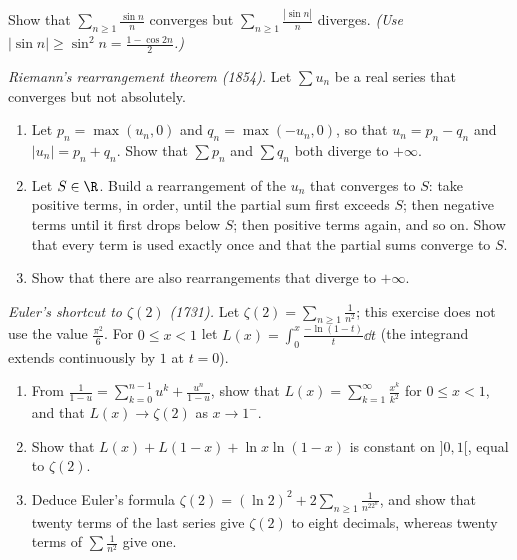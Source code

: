 \begin{exercise}[$\star\star$]\label{ex:sinn}
Show that $\sum_{n\ge1}\frac{\sin n}n$ converges but $\sum_{n\ge1}\frac{|\sin n|}n$ diverges. \emph{(Use $|\sin n|\ge\sin^2n=\frac{1-\cos2n}2$.)}
\end{exercise}

\begin{exercise}[$\star\star\star$]\label{ex:riemannrearr}
\emph{Riemann's rearrangement theorem (1854).} Let $\sum u_n$ be a real series that converges but not absolutely.
\begin{enumerate}[label=(\alph*)]
\item Let $p_n=\max(u_n,0)$ and $q_n=\max(-u_n,0)$, so that $u_n=p_n-q_n$ and $|u_n|=p_n+q_n$. Show that $\sum p_n$ and $\sum q_n$ both diverge to $+\infty$.
\item Let $S\in\R$. Build a rearrangement of the $u_n$ that converges to $S$: take positive terms, in order, until the partial sum first exceeds $S$; then negative terms until it first drops below $S$; then positive terms again, and so on. Show that every term is used exactly once and that the partial sums converge to $S$.
\item Show that there are also rearrangements that diverge to $+\infty$.
\end{enumerate}
\end{exercise}

\begin{exercise}[$\star\star\star$]\label{ex:eulerbasel}
\emph{Euler's shortcut to $\zeta(2)$ (1731).} Let $\zeta(2)=\sum_{n\ge1}\frac1{n^2}$; this exercise does not use the value $\frac{\pi^2}6$. For $0\le x<1$ let
$L(x)=\displaystyle\int_0^x\frac{-\ln(1-t)}t\dd t$ (the integrand extends continuously by $1$ at $t=0$).
\begin{enumerate}[label=(\alph*)]
\item From $\frac1{1-u}=\sum_{k=0}^{n-1}u^k+\frac{u^n}{1-u}$, show that $L(x)=\sum_{k=1}^\infty\frac{x^k}{k^2}$ for $0\le x<1$, and that $L(x)\to\zeta(2)$ as $x\to1^-$.
\item Show that $L(x)+L(1-x)+\ln x\ln(1-x)$ is constant on $]0,1[$, equal to $\zeta(2)$.
\item Deduce Euler's formula $\zeta(2)=(\ln2)^2+2\sum_{n\ge1}\frac1{n^22^n}$, and show that twenty terms of the last series give $\zeta(2)$ to eight decimals, whereas twenty terms of $\sum\frac1{n^2}$ give one.
\end{enumerate}
\end{exercise}

